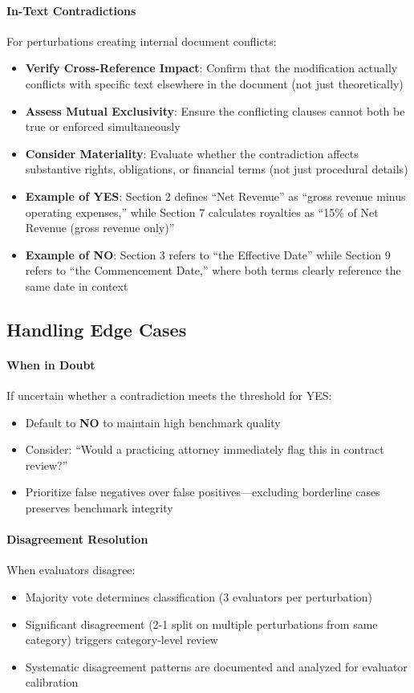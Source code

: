 \documentclass[11pt]{article}
\begin{document}
\paragraph{In-Text Contradictions} For perturbations creating internal document conflicts:
\begin{itemize}[leftmargin=*,itemsep=0.1em]
    \item \textbf{Verify Cross-Reference Impact}: Confirm that the modification actually conflicts with specific text elsewhere in the document (not just theoretically)
    \item \textbf{Assess Mutual Exclusivity}: Ensure the conflicting clauses cannot both be true or enforced simultaneously
    \item \textbf{Consider Materiality}: Evaluate whether the contradiction affects substantive rights, obligations, or financial terms (not just procedural details)
    \item \textbf{Example of YES}: Section 2 defines ``Net Revenue'' as ``gross revenue minus operating expenses,'' while Section 7 calculates royalties as ``15\% of Net Revenue (gross revenue only)''
    \item \textbf{Example of NO}: Section 3 refers to ``the Effective Date'' while Section 9 refers to ``the Commencement Date,'' where both terms clearly reference the same date in context
\end{itemize}

\subsection{Handling Edge Cases}

\paragraph{When in Doubt} If uncertain whether a contradiction meets the threshold for YES:
\begin{itemize}[leftmargin=*,itemsep=0.1em]
    \item Default to \textbf{NO} to maintain high benchmark quality
    \item Consider: ``Would a practicing attorney immediately flag this in contract review?''
    \item Prioritize false negatives over false positives—excluding borderline cases preserves benchmark integrity
\end{itemize}

\paragraph{Disagreement Resolution} When evaluators disagree:
\begin{itemize}[leftmargin=*,itemsep=0.1em]
    \item Majority vote determines classification (3 evaluators per perturbation)
    \item Significant disagreement (2-1 split on multiple perturbations from same category) triggers category-level review
    \item Systematic disagreement patterns are documented and analyzed for evaluator calibration
\end{itemize}
\end{document}
